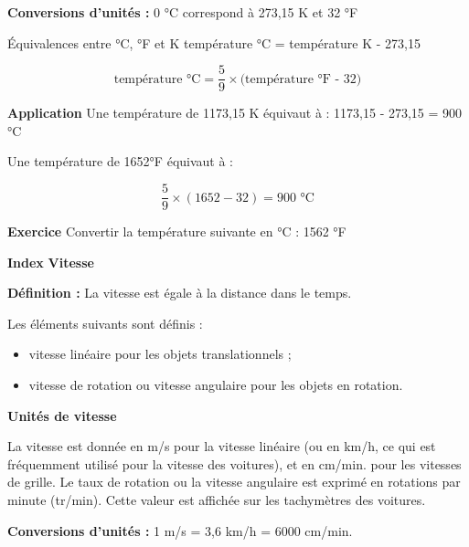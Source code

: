 			 
		
\newpage
\textbf{Conversions d'unités : } 0 °C correspond à 273,15 K et 32 °F

Équivalences entre °C, °F et K
température °C = température K - 273,15

\begin{equation}
    \text{température °C} = \frac{5}{9} \times \text{(température °F - 32)}
\end{equation}



\textbf{Application}
\vspace{0.3cm}
Une température de 1173,15 K équivaut à :
1173,15 - 273,15 = 900 °C

Une température de 1652°F équivaut à :

\begin{equation}
\frac{5}{9} \times (1652 - 32) = 900 \text{ °C}
\end{equation}

\textbf{Exercice}
\vspace{0.3cm}
Convertir la température suivante en °C : 1562 °F

\textbf{Index}
\vspace{0.3cm}
\textbf{Vitesse}
\vspace{0.3cm}

\textbf{Définition : }La vitesse est égale à la distance dans le temps.



Les éléments suivants sont définis :
\begin{itemize}
    \item vitesse linéaire pour les objets translationnels ;
    \item vitesse de rotation ou vitesse angulaire pour les objets en rotation.
\end{itemize}

\vspace{0.3cm}
\textbf{Unités de vitesse}
\vspace{0.3cm}

La vitesse est donnée en m/s pour la vitesse linéaire (ou en km/h, ce qui est fréquemment utilisé pour la vitesse des voitures), et en cm/min. pour les vitesses de grille.
\vspace{0.3cm}
Le taux de rotation ou la vitesse angulaire est exprimé en rotations par minute (tr/min). Cette valeur est affichée sur les tachymètres des voitures.

\vspace{0.3cm}
\textbf{Conversions d'unités :}
\vspace{0.3cm}
1 m/s = 3,6 km/h = 6000 cm/min.

